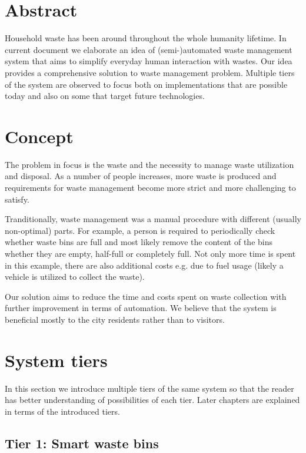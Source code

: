 \documentclass{article}
\title{Exercise 1: Design for urban IoT. Waste management system
\author{Andrei Golubev, Hassan Shaheen}
\date{\parbox{\linewidth}{\centering
  \endgraf\bigskip
  University of Oulu
  \endgraf\bigskip\today}}
}
\begin{document}
\maketitle
\newpage

\section{Abstract}
Household waste has been around throughout the whole humanity lifetime. In current document we
elaborate an idea of (semi-)automated waste management system that aims to simplify everyday human
interaction with wastes. Our idea provides a comprehensive solution to waste management problem.
Multiple tiers of the system are observed to focus both on implementations that are possible today
and also on some that target future technologies.

\section{Concept}

The problem in focus is the waste and the necessity to manage waste utilization and disposal. As a
number of people increases, more waste is produced and requirements for waste management become more
strict and more challenging to satisfy.

Tranditionally, waste management was a manual procedure with different (usually non-optimal) parts.
For example, a person is required to periodically check whether waste bins are full and most likely
remove the content of the bins whether they are empty, half-full or completely full. Not only more
time is spent in this example, there are also additional costs e.g. due to fuel usage (likely a
vehicle is utilized to collect the waste).

Our solution aims to reduce the time and costs spent on waste collection with further improvement in
terms of automation. We believe that the system is beneficial mostly to the city residents rather
than to visitors.

\section{System tiers}

In this section we introduce multiple tiers of the same system so that the reader has better
understanding of possibilities of each tier. Later chapters are explained in terms of the introduced
tiers.

\subsection{Tier 1: Smart waste bins}
\end{document}
